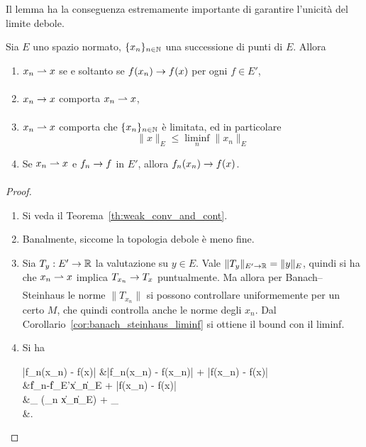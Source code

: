 \begin{remark}
	Il lemma ha la conseguenza estremamente importante di garantire l'unicità del limite debole.
\end{remark}

\begin{lemma}
\label{lemma:weaktop_five}
	Sia $E$ uno spazio normato, $\{x_n\}_{n \in \mathbb{N}}$ una successione di punti di $E$. Allora
	\begin{enumerate}
		\item $x_n \rightharpoonup x$ se e soltanto se $f(x_n) \underset{{}}{\rightarrow} f(x)$ per ogni $f \in E'$,
		\item $x_n \underset{{}}{\rightarrow} x$ comporta $x_n \rightharpoonup x$,
		\item $x_n \rightharpoonup x$ comporta che $\{x_n\}_{n \in \mathbb{N}}$ è limitata, ed in particolare
		\begin{equation*}
			\|x\|_E \leq \liminf_n \|x_n\|_E
		\end{equation*}
		\item Se $x_n \rightharpoonup x$ e $f_n \underset{{}}{\rightarrow} f$ in $E'$, allora $f_n(x_n) \underset{{}}{\rightarrow} f(x)$.
	\end{enumerate}
\end{lemma}
\begin{proof}
	\leavevmode
	\begin{enumerate}
		\item Si veda il Teorema~\ref{th:weak_conv_and_cont}.
		\item Banalmente, siccome la topologia debole è meno fine.
		\item Sia $T_y : E' \to \mathbb{R}$ la valutazione su $y \in E$. Vale $\|T_y\|_{E' \to \mathbb{R}} = \|y\|_E$, quindi si ha che $x_n \rightharpoonup x$ implica $T_{x_n} \underset{{}}{\rightarrow} T_x$ puntualmente. Ma allora per Banach--Steinhaus le norme $\|T_{x_n}\|$ si possono controllare uniformemente per un certo $M$, che quindi controlla anche le norme degli $x_n$. Dal Corollario~\ref{cor:banach_steinhaus_liminf} si ottiene il bound con il liminf.
		\item Si ha
		\begin{eqalign*}
			|f_n(x_n) - f(x)| &\leq |f_n(x_n) - f(x_n)| + |f(x_n) - f(x)|\\
			&\leq \|f_n-f\|_{E'}\|x_n\|_E + |f(x_n) - f(x)|\\
			&\leq {}_{} (\liminf_n \|x_n\|_E) + _{}\\
			&.
		\end{eqalign*}
	\end{enumerate}
\end{proof}


